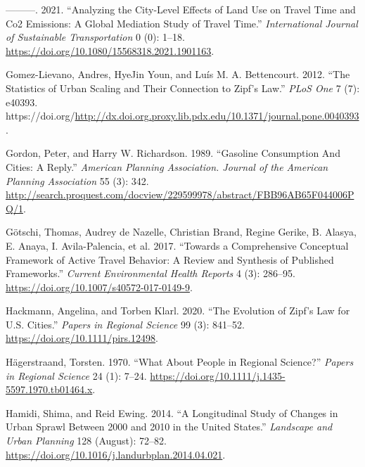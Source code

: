 \documentclass[
  11pt,
  openany]{memoir}
\newlength{\cslhangindent}
\newlength{\cslentryspacingunit} %
\newenvironment{CSLReferences}[2] %
 {%
  \setlength{\parindent}{0pt}
  \ifodd #1
  \let\oldpar\par
  \def\par{\hangindent=\cslhangindent\oldpar}
  \fi
  \setlength{\parskip}{#2\cslentryspacingunit}
 }%
 {}
\begin{document}
\begin{CSLReferences}{1}{0}
\leavevmode{}%
---------. 2021. {``Analyzing the City-Level Effects of Land Use on Travel Time and {Co2} Emissions: A Global Mediation Study of Travel Time.''} \emph{International Journal of Sustainable Transportation} 0 (0): 1--18. \url{https://doi.org/10.1080/15568318.2021.1901163}.

\leavevmode{}%
Gomez-Lievano, Andres, HyeJin Youn, and Luís M. A. Bettencourt. 2012. {``The {Statistics} of {Urban Scaling} and {Their Connection} to {Zipf}'s {Law}.''} \emph{PLoS One} 7 (7): e40393. https://doi.org/\url{http://dx.doi.org.proxy.lib.pdx.edu/10.1371/journal.pone.0040393}.

\leavevmode{}%
Gordon, Peter, and Harry W. Richardson. 1989. {``Gasoline {Consumption And Cities}: A {Reply}.''} \emph{American Planning Association. Journal of the American Planning Association} 55 (3): 342. \url{http://search.proquest.com/docview/229599978/abstract/FBB96AB65F044006PQ/1}.

\leavevmode{}%
Götschi, Thomas, Audrey de Nazelle, Christian Brand, Regine Gerike, B. Alasya, E. Anaya, I. Avila-Palencia, et al. 2017. {``Towards a {Comprehensive Conceptual Framework} of {Active Travel Behavior}: A {Review} and {Synthesis} of {Published Frameworks}.''} \emph{Current Environmental Health Reports} 4 (3): 286--95. \url{https://doi.org/10.1007/s40572-017-0149-9}.

\leavevmode{}%
Hackmann, Angelina, and Torben Klarl. 2020. {``The Evolution of {Zipf}'s {Law} for {U}.{S}. Cities.''} \emph{Papers in Regional Science} 99 (3): 841--52. \url{https://doi.org/10.1111/pirs.12498}.

\leavevmode{}%
Hägerstraand, Torsten. 1970. {``What {About People} in {Regional Science}?''} \emph{Papers in Regional Science} 24 (1): 7--24. \url{https://doi.org/10.1111/j.1435-5597.1970.tb01464.x}.

\leavevmode{}%
Hamidi, Shima, and Reid Ewing. 2014. {``A Longitudinal Study of Changes in Urban Sprawl Between 2000 and 2010 in the {United States}.''} \emph{Landscape and Urban Planning} 128 (August): 72--82. \url{https://doi.org/10.1016/j.landurbplan.2014.04.021}.


\end{CSLReferences}
\end{document}
